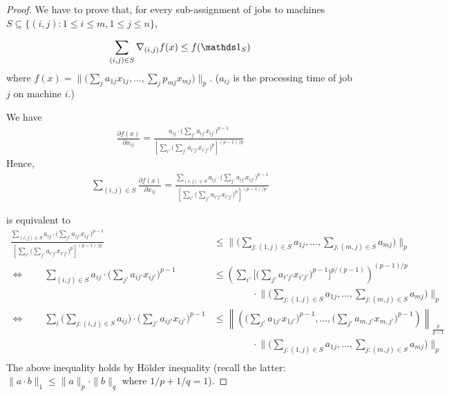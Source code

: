 \begin{proof}

We have to prove that, for every sub-assignment of jobs to machines $S \subseteq \{(i,j): 1 \leq i \leq m, 1 \leq j \leq n\}$,

\begin{align}	\label{eq:lp-smooth}
\sum_{(i,j) \in S} \nabla_{(i,j)} f(x) \leq f(\one_{S})
\end{align}
where $f(x) = \| \bigl( \sum_{j} a_{1j} x_{1j}, \ldots, \sum_{j} p_{mj} x_{mj} \bigr)\|_{p}$.
($a_{ij}$ is the processing time of job $j$ on machine $i$.)


We have
%
\begin{align*}
\frac{\partial f(x)}{\partial x_{ij}}
= \frac{a_{ij} \cdot \bigl( \sum_{j'} a_{ij'} x_{ij'} \bigr)^{p-1} }{ \left[ \sum_{i'} \bigl( \sum_{j'} a_{i'j'} x_{i'j'} \bigr)^{p} \right]^{(p-1)/p}}
\end{align*}
Hence,
\begin{align*}
\sum_{(i,j) \in S} \frac{\partial f(x)}{\partial x_{ij}}
= \frac{ \sum_{(i,j) \in S} a_{ij} \cdot \bigl( \sum_{j'} a_{ij'} x_{ij'} \bigr)^{p-1} }{ \left[ \sum_{i'} \bigl( \sum_{j'} a_{i'j'} x_{i'j'} \bigr)^{p} \right]^{(p-1)/p}}
\end{align*}

 is equivalent to
\begin{align*}
 \frac{ \sum_{(i,j) \in S} a_{ij} \cdot \bigl( \sum_{j'} a_{ij'} x_{ij'} \bigr)^{p-1} }{ \left[ \sum_{i'} \bigl( \sum_{j'} a_{i'j'} x_{i'j'} \bigr)^{p} \right]^{(p-1)/p}}
&\leq  \biggl \| \biggl( \sum_{j: (1,j) \in S} a_{1j}, \ldots, \sum_{j: (m,j) \in S} a_{mj}  \biggr) \biggr\|_{p} \\
%
\Longleftrightarrow \qquad
    \sum_{(i,j) \in S} a_{ij} \cdot \bigl( \sum_{j'} a_{ij'} x_{ij'} \bigr)^{p-1} &\leq
        \left ( \sum_{i'} \biggl [ \biggl( \sum_{j'} a_{i'j'} x_{i'j'} \biggr)^{p-1} \biggr]^{p/(p-1)} \right)^{(p-1)/p} \\
            & \qquad \qquad \cdot \biggl \| \biggl( \sum_{j: (1,j) \in S} a_{1j}, \ldots, \sum_{j: (m,j) \in S} a_{mj}  \biggr) \biggr\|_{p} \\
%
\Longleftrightarrow \qquad
    \sum_{i} \biggl ( \sum_{j: (i,j) \in S} a_{ij} \biggr) \cdot \biggl( \sum_{j'} a_{ij'} x_{ij'} \biggr)^{p-1} &\leq
        \left \| \left( \biggl( \sum_{j'} a_{1j'} x_{1j'} \biggr)^{p-1}, \ldots, \biggl( \sum_{j'} a_{m,j'} x_{m,j'} \biggr)^{p-1} \right)   \right \|_{\frac{p}{p-1}}  \\
            & \qquad \qquad \cdot \biggl \| \biggl( \sum_{j: (1,j) \in S} a_{1j}, \ldots, \sum_{j: (m,j) \in S} a_{mj}  \biggr) \biggr\|_{p} \\
                        
\end{align*}
The above inequality holds by H\"older inequality (recall the latter: $\| a \cdot b\|_{1} \leq \| a \|_{p} \cdot \| b \|_{q}$ where $1/p + 1/q = 1$).
\end{proof}

